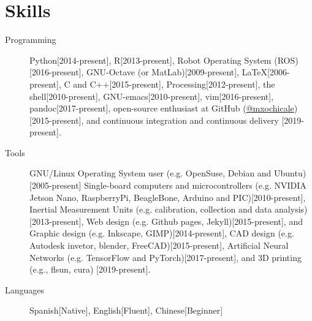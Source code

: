 \documentclass{mycv}
\begin{document}
\section{Skills}
\begin{description}
  \item[Programming] Python[2014-present],
R[2013-present], 
Robot Operating System (ROS)[2016-present],
GNU-Octave (or MatLab)[2009-present],
\LaTeX [2006-present], 
C and C++[2015-present],
Processing[2012-present], 
the shell[2010-present], 
GNU-emacs[2010-present],
vim[2016-present], 
pandoc[2017-present],
open-source enthusiast at GitHub (\href{https://github.com/mxochicale}{@mxochicale})[2015-present], 
and continuous integration and continuous delivery [2019-present]. 
  \item[Tools] 
GNU/Linux Operating System user (e.g. OpenSuse, Debian and Ubuntu)[2005-present]
Single-board computers and microcontrollers (e.g. 
NVIDIA Jetson Nano, RaspberryPi, BeagleBone, Arduino and PIC)[2010-present],
Inertial Measurement Units (e.g. calibration, collection and data analysis)[2013-present], 
Web design (e.g. Github pages, Jekyll)[2015-present], and
Graphic design (e.g. Inkscape, GIMP)[2014-present],
CAD design (e.g. Autodesk invetor, blender, FreeCAD)[2015-present], 
Artificial Neural Networks (e.g. TensorFlow and PyTorch)[2017-present], and
3D printing (e.g., flsun, cura) [2019-present].
  \item[Languages] Spanish[Native], English[Fluent], Chinese[Beginner]
\end{description}
\end{document}

